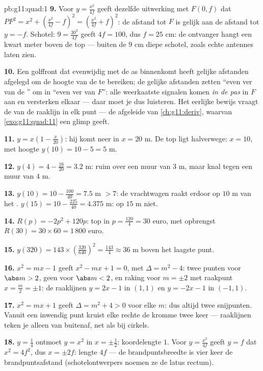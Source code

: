 \begin{solution}{pb:g11:quad:1}
\textbf{9.} Voor $y = \frac{x^2}{4f}$ geeft dezelfde uitwerking met
$F(0, f)$ dat $PF^2 = x^2 + \left(\frac{x^2}{4f} - f\right)^2
= \left(\frac{x^2}{4f} + f\right)^2$: de afstand tot $F$ is gelijk aan de
afstand tot $y = -f$. Schotel: $9 = \frac{30^2}{4f}$ geeft $4f = 100$, dus
$f = 25$ cm: de ontvanger hangt een kwart meter boven de top --- buiten de
$9$ cm diepe schotel, zoals echte antennes laten zien.

\textbf{10.} Een golffront dat evenwijdig met de as binnenkomt heeft gelijke
afstanden afgelegd om de hoogte van de  te bereiken; de gelijke
afstanden zetten ``even ver van de '' om in ``even ver van $F$'':
alle weerkaatste signalen komen \emph{in de pas} in $F$ aan en versterken
elkaar --- daar moet je dus luisteren. Het eerlijke bewijs vraagt de
 van de raaklijn in elk punt --- de afgeleide van
\cref{ch:g11:deriv}, waarvan \cref{exo:g11:quad:11} een glimp geeft.

\textbf{11.} $y = x\left(1 - \frac{x}{20}\right)$: hij komt neer in
$x = 20$ m. De top ligt halverwege: $x = 10$, met hoogte
$y(10) = 10 - 5 = 5$ m.

\textbf{12.} $y(4) = 4 - \frac{16}{20} = 3.2$ m: ruim over een muur van
$3$ m, maar knal tegen een muur van $4$ m.

\textbf{13.} $y(10) = 10 - \frac{100}{40} = 7.5$ m $> 7$: de vrachtwagen
raakt erdoor op $10$ m van het . $y(15) = 10 - \frac{225}{40} =
4.375$ m: op $15$ m niet.

\textbf{14.} $R(p) = -2p^2 + 120p$: top in $p = \frac{120}{4} = 30$ euro,
met opbrengst $R(30) = 30 \times 60 = 1\,800$ euro.

\textbf{15.} $y(320) = 143 \times \left(\frac{320}{640}\right)^2 =
\frac{143}{4} \approx 36$ m boven het laagste punt.

\textbf{16.} $x^2 = mx - 1$ geeft $x^2 - mx + 1 = 0$, met
$\Delta = m^2 - 4$: twee punten voor $\abs m > 2$, geen voor $\abs m < 2$,
en raking voor $m = \pm 2$ met raakpunt $x = \frac m2 = \pm 1$: de
raaklijnen $y = 2x - 1$ in $(1, 1)$ en $y = -2x - 1$ in $(-1, 1)$.

\textbf{17.} $x^2 = mx + 1$ geeft $\Delta = m^2 + 4 > 0$ voor elke $m$: dus
altijd twee snijpunten. Vanuit een inwendig punt kruist elke rechte de
kromme twee keer --- raaklijnen teken je alleen van buitenaf, net als bij
cirkels.

\textbf{18.} $y = \frac14$ ontmoet $y = x^2$ in $x = \pm\frac12$:
koordelengte $1$. Voor $y = \frac{x^2}{4f}$ geeft $y = f$ dat $x^2 = 4f^2$,
dus $x = \pm 2f$: lengte $4f$ --- de brandpuntsbreedte is vier keer de
brandpuntsafstand (schotelontwerpers noemen ze de latus rectum).


\end{solution}
